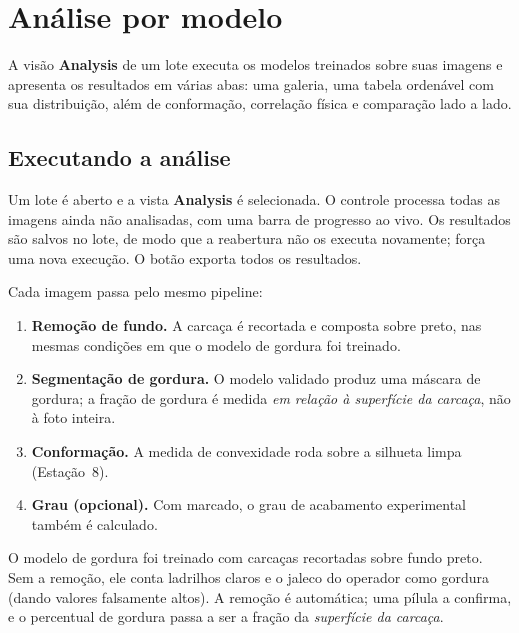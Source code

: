 \chapter{Análise por modelo}


\vspace{4pt}
A visão \textbf{Analysis} de um lote executa os modelos treinados sobre suas imagens e
apresenta os resultados em várias abas: uma galeria, uma tabela ordenável com sua
distribuição, além de conformação, correlação física e comparação lado a lado.

\section{Executando a análise}

Um lote é aberto e a vista \textbf{Analysis} é selecionada. O controle
 processa todas as imagens ainda não analisadas, com uma barra de
progresso ao vivo. Os resultados são salvos no lote, de modo que a reabertura não os
executa novamente;  força uma nova execução. O botão 
exporta todos os resultados.

Cada imagem passa pelo mesmo pipeline:

\begin{enumerate}[leftmargin=1.4em,itemsep=3pt]
  \item \textbf{Remoção de fundo.} A carcaça é recortada e composta sobre
        preto, nas mesmas condições em que o modelo de gordura foi treinado.
  \item \textbf{Segmentação de gordura.} O modelo validado produz uma máscara de gordura; a
        fração de gordura é medida \emph{em relação à superfície da carcaça}, não
        à foto inteira.
  \item \textbf{Conformação.} A medida de convexidade roda sobre a silhueta limpa
        (Estação~8).
  \item \textbf{Grau (opcional).} Com 
        marcado, o grau de acabamento experimental também é calculado.
\end{enumerate}

\begin{caution}[title={Por que a remoção de fundo importa}]
O modelo de gordura foi treinado com carcaças recortadas sobre fundo preto. Sem a
remoção, ele conta ladrilhos claros e o jaleco do operador como gordura (dando valores
falsamente altos). A remoção é automática; uma pílula  a confirma,
e o percentual de gordura passa a ser a fração da \emph{superfície da carcaça}.
\end{caution}

